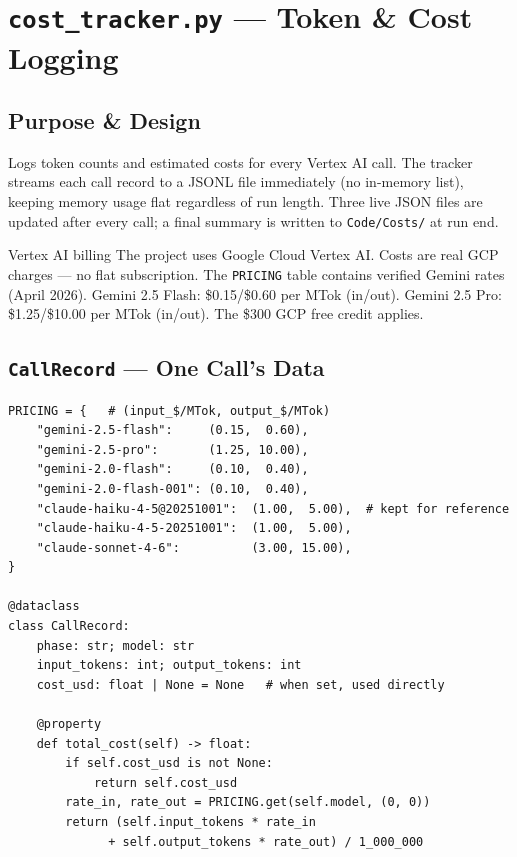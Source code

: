 \documentclass[11pt,a4paper]{report}
\newcommand{\fn}[1]{\texttt{#1}}
\newcommand{\pyf}[1]{\texttt{#1}}
\begin{document}
\chapter{\pyf{cost\_tracker.py} --- Token \& Cost Logging}

\section{Purpose \& Design}

Logs token counts and estimated costs for every Vertex AI call.  The tracker streams
each call record to a JSONL file immediately (no in-memory list), keeping memory
usage flat regardless of run length.  Three live JSON files are updated after every
call; a final summary is written to \fn{Code/Costs/} at run end.

\begin{concept}{Vertex AI billing}
The project uses Google Cloud Vertex AI.  Costs are real GCP charges --- no flat
subscription.  The \fn{PRICING} table contains verified Gemini rates (April 2026).
Gemini 2.5 Flash: \$0.15/\$0.60 per MTok (in/out).
Gemini 2.5 Pro: \$1.25/\$10.00 per MTok (in/out).
The \$300 GCP free credit applies.
\end{concept}

\section{\fn{CallRecord} --- One Call's Data}

\begin{lstlisting}[style=py]
PRICING = {   # (input_$/MTok, output_$/MTok)
    "gemini-2.5-flash":     (0.15,  0.60),
    "gemini-2.5-pro":       (1.25, 10.00),
    "gemini-2.0-flash":     (0.10,  0.40),
    "gemini-2.0-flash-001": (0.10,  0.40),
    "claude-haiku-4-5@20251001":  (1.00,  5.00),  # kept for reference
    "claude-haiku-4-5-20251001":  (1.00,  5.00),
    "claude-sonnet-4-6":          (3.00, 15.00),
}

@dataclass
class CallRecord:
    phase: str; model: str
    input_tokens: int; output_tokens: int
    cost_usd: float | None = None   # when set, used directly

    @property
    def total_cost(self) -> float:
        if self.cost_usd is not None:
            return self.cost_usd
        rate_in, rate_out = PRICING.get(self.model, (0, 0))
        return (self.input_tokens * rate_in
              + self.output_tokens * rate_out) / 1_000_000
\end{lstlisting}
\end{document}
